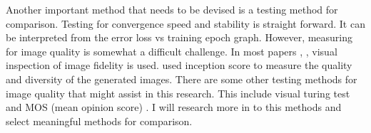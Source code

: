 \documentclass[../main/main.tex]{subfiles}
\begin{document}
	Another important method that needs to be devised is a testing method for comparison. Testing for convergence speed and stability is straight forward. It can be interpreted from the error loss vs training epoch graph. However, measuring for image quality is somewhat a difficult challenge. In most papers \cite{Jolicoeur-Martineau2019}, \cite{arjovsky2017wasserstein}, \cite{gulrajani2017improved} visual inspection of image fidelity is used. \cite{Li2018BEGANs} used inception score to measure the quality and diversity of the generated images. There are some other testing methods for image quality that might assist in this research. This include visual turing test \cite{geman2015visual} and \gls{MOS} (mean opinion score) \cite{streijl2016mean}. I will research more in to this methods and select meaningful methods for comparison.
\end{document}
